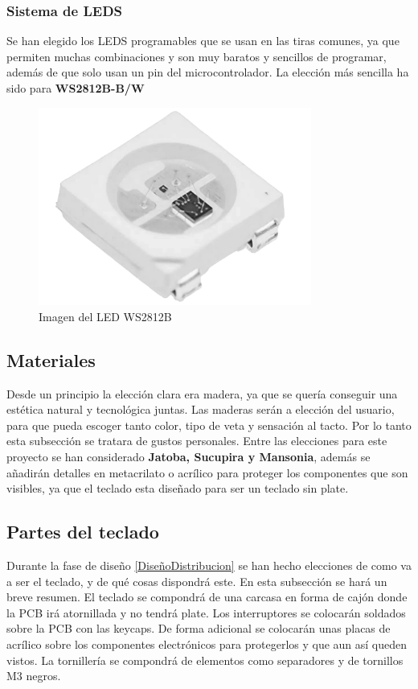 \subsubsection{Sistema de \gls{LED}S} \label{DiseñoLeds}
Se han elegido los \gls{LED}S programables que se usan en las tiras comunes, ya que permiten muchas combinaciones y son muy baratos y sencillos de programar, además de que solo usan un pin del microcontrolador. La elección más sencilla ha sido para \textbf{WS2812B-B/W}

\begin{figure}[H]
    \centering
    \includegraphics[width=0.8\textwidth]{imagenes/Capitulos/Cap03/WS2812B.png}
    \caption{Imagen del \gls{LED} WS2812B}
    \label{fig:WS2812B}
\end{figure}

\subsection{Materiales}
Desde un principio la elección clara era madera, ya que se quería conseguir una estética natural y tecnológica juntas. Las maderas serán a elección del usuario, para que pueda escoger tanto color, tipo de veta y sensación al tacto.
Por lo tanto esta subsección se tratara de gustos personales. Entre las elecciones para este proyecto se han considerado \textbf{Jatoba, Sucupira y Mansonia}, además se añadirán detalles en metacrilato o acrílico para proteger los componentes que son visibles, ya que el teclado esta diseñado para ser un teclado sin plate.

\subsection{Partes del teclado}
Durante la fase de diseño \ref{DiseñoDistribucion} se han hecho elecciones de como va a ser el teclado, y de qué cosas dispondrá este. En esta subsección se hará un breve resumen. El teclado se compondrá de una carcasa en forma de cajón donde la \gls{PCB} irá atornillada y no tendrá plate. Los interruptores se colocarán soldados sobre la \gls{PCB} con las keycaps. De forma adicional se colocarán unas placas de acrílico sobre los componentes electrónicos para protegerlos y que aun así queden vistos. La tornillería se compondrá de elementos como separadores y de tornillos M3 negros.

